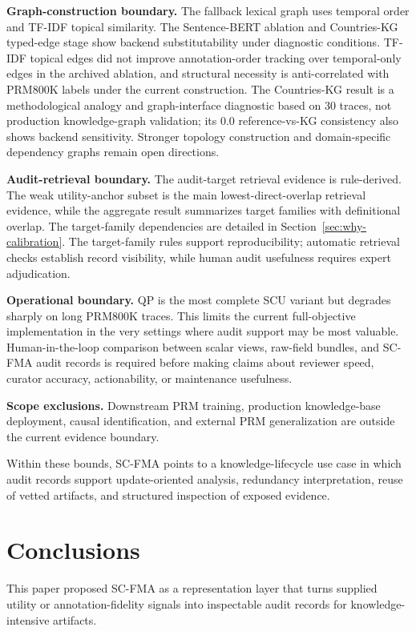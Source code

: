 \documentclass[a4paper,fleqn]{cas-sc}
\begin{document}
\textbf{Graph-construction boundary.} The fallback lexical graph uses temporal order and TF-IDF topical similarity. The Sentence-BERT ablation and Countries-KG typed-edge stage show backend substitutability under diagnostic conditions. TF-IDF topical edges did not improve annotation-order tracking over temporal-only edges in the archived ablation, and structural necessity is anti-correlated with PRM800K labels under the current construction. The Countries-KG result is a methodological analogy and graph-interface diagnostic based on 30 traces, not production knowledge-graph validation; its 0.0 reference-vs-KG consistency also shows backend sensitivity. Stronger topology construction and domain-specific dependency graphs remain open directions.

\textbf{Audit-retrieval boundary.} The audit-target retrieval evidence is rule-derived. The weak utility-anchor subset is the main lowest-direct-overlap retrieval evidence, while the aggregate result summarizes target families with definitional overlap. The target-family dependencies are detailed in Section~\ref{sec:why-calibration}. The target-family rules support reproducibility; automatic retrieval checks establish record visibility, while human audit usefulness requires expert adjudication.

\textbf{Operational boundary.} QP is the most complete SCU variant but degrades sharply on long PRM800K traces. This limits the current full-objective implementation in the very settings where audit support may be most valuable. Human-in-the-loop comparison between scalar views, raw-field bundles, and SC-FMA audit records is required before making claims about reviewer speed, curator accuracy, actionability, or maintenance usefulness.

\medskip
\noindent\textbf{Scope exclusions.} Downstream PRM training, production knowledge-base deployment, causal identification, and external PRM generalization are outside the current evidence boundary.

\noindent Within these bounds, SC-FMA points to a knowledge-lifecycle use case in which audit records support update-oriented analysis, redundancy interpretation, reuse of vetted artifacts, and structured inspection of exposed evidence.

\section{Conclusions}
\label{sec:conclusions}

This paper proposed SC-FMA as a representation layer that turns supplied utility or annotation-fidelity signals into inspectable audit records for knowledge-intensive artifacts.
\end{document}
